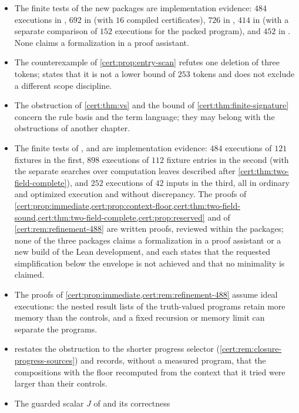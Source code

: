 \begin{itemize}
argument and by $61$ fixtures run $244$ times.
\item The finite tests of the new packages are implementation evidence: $484$
executions in , $692$ in 
(with $16$ compiled certificates), $726$ in , $414$ in
 (with a separate comparison of $152$ executions for
the packed program), and $452$ in . None claims a
formalization in a proof assistant.
\item The counterexample of \cref{cert:prop:entry-scan} refutes one deletion
of three tokens;  states that it is not a lower bound
of $253$ tokens and does not exclude a different scope discipline.
\item The obstruction of \cref{cert:thm:vs} and the bound of
\cref{cert:thm:finite-signature} concern the rule basis and the term
language; they may belong with the obstructions of another chapter.
\item The finite tests of , 
and  are implementation evidence: $484$ executions
of $121$ fixtures in the first, $898$ executions of $112$ fixture entries in
the second (with the separate searches over computation leaves described after
\cref{cert:thm:two-field-complete}), and $252$ executions of $42$ inputs in
the third, all in ordinary and optimized execution and without discrepancy.
The proofs of \cref{cert:prop:immediate,cert:prop:context-floor,cert:thm:two-field-sound,cert:thm:two-field-complete,cert:prop:reserved}
and of \cref{cert:rem:refinement-488} are written proofs, reviewed within the
packages; none of the three packages claims a formalization in a proof
assistant or a new build of the Lean development, and each states that the
requested simplification below the envelope is not achieved and that no
minimality is claimed.
\item The proofs of \cref{cert:prop:immediate,cert:rem:refinement-488} assume
ideal executions: the nested result lists of the truth-valued programs retain
more memory than the controls, and a fixed recursion or memory limit can
separate the programs.
\item {} restates the obstruction to the shorter
progress selector (\cref{cert:rem:closure-progress-sources}) and records,
without a measured program, that the compositions with the floor recomputed
from the context that it tried were larger than their controls.
\item The guarded scalar $J$ of  and its correctness

\end{itemize}

